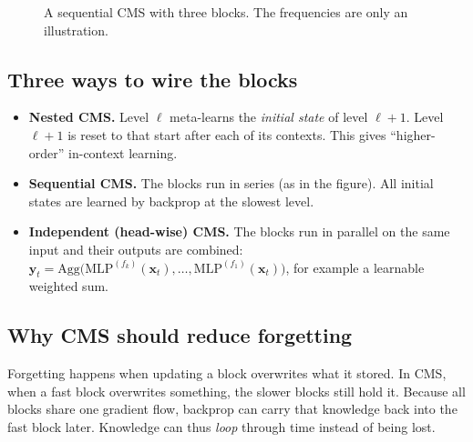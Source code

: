\documentclass[11pt,a4paper]{article}
\newcommand{\bx}{\mathbf{x}}
\newcommand{\by}{\mathbf{y}}
\begin{document}
\begin{figure}[h]
\centering
{}
\caption{A sequential CMS with three blocks. The frequencies are only an illustration.}
\end{figure}

\subsection{Three ways to wire the blocks}
\begin{itemize}
  \item \textbf{Nested CMS.} Level $\ell$ meta-learns the \emph{initial state} of level $\ell+1$. Level $\ell+1$ is reset to that start after each of its contexts. This gives ``higher-order'' in-context learning.
  \item \textbf{Sequential CMS.} The blocks run in series (as in the figure). All initial states are learned by backprop at the slowest level.
  \item \textbf{Independent (head-wise) CMS.} The blocks run in parallel on the same input and their outputs are combined: $\by_t = \mathrm{Agg}\big(\mathrm{MLP}^{(f_k)}(\bx_t),\dots,\mathrm{MLP}^{(f_1)}(\bx_t)\big)$, for example a learnable weighted sum.
\end{itemize}

\subsection{Why CMS should reduce forgetting}
Forgetting happens when updating a block overwrites what it stored. In CMS, when a fast block overwrites something, the slower blocks still hold it. Because all blocks share one gradient flow, backprop can carry that knowledge back into the fast block later. Knowledge can thus \emph{loop} through time instead of being lost.
\end{document}
